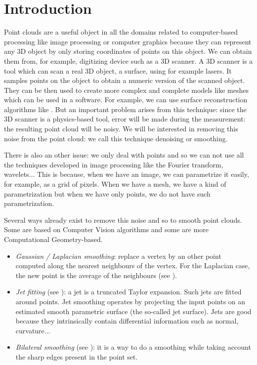 

\chapter{Introduction}

Point clouds are a useful object in all the domains related to computer-based
processing like image processing or computer graphics because they can
represent any 3D object by only storing coordinates of points on this object. We
can obtain them from, for example, digitizing device such as a 3D scanner. A 3D
scanner is a tool which can scan a real 3D object, a surface, using for example
lasers. It samples points on the object to obtain a numeric version of the
scanned object. They can be then used to create more complex and complete models
like meshes which can be used in a software. For example, we can use surface
reconstruction algorithms like \cite{alexa2003computing}. But an important
problem arises from this technique: since the 3D scanner is a physics-based
tool, error will be made during the measurement: the resulting point cloud will
be noisy. We will be interested in removing this noise from the point cloud: we
call this technique denoising or smoothing.

There is also an other issue: we only deal with points and so we can not use all
the techniques developed in image processing like the Fourier transform,
wavelets... This is because, when we have an image, we can parametrize it
easily, for example, as a grid of pixels.  When we have a mesh, we have a kind
of parametrization but when we have only points, we do not have such
parametrization.

Several ways already exist to remove this noise and so to smooth point clouds.
Some are based on Computer Vision algorithms and some are more Computational
Geometry-based.

\begin{itemize}
    \item \textit{Gaussian / Laplacian smoothing}: replace a vertex by an other point
        computed along the nearest neighbours of the vertex. For the Laplacian
        case, the new point is the average of the neighbours (see
        \cite{vollmer1999improved}).
    \item \textit{Jet fitting} (see \cite{cazals2005estimating}): a jet is a truncated
        Taylor expansion. Such jets are fitted around points. Jet smoothing
        operates by projecting the input points on an estimated smooth
        parametric surface (the so-called jet surface). Jets are good because
        they intrinsically contain differential information such as normal,
        curvature...
    \item \textit{Bilateral smoothing} (see \cite{huang2013edge}): it is a way to do a
        smoothing while taking account the sharp edges present in the point set.
\end{itemize}


